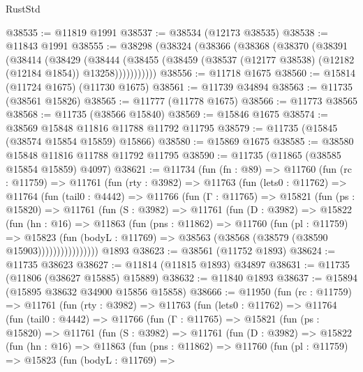 \begin{lexlean}{RustStd}
\begin{coremodule}
@38535 := @11819 @1991
@38537 := @38534 (@12173 @38535)
@38538 := @11843 @1991
@38555 := @38298
    (@38324
      (@38366
        (@38368
          (@38370
            (@38391
              (@38414
                (@38429
                  (@38444
                    (@38455
                      (@38459 (@38537 (@12177 @38538) (@12182 (@12184 @1854)) @13258)))))))))))
@38556 := @11718 @1675
@38560 := @15814 (@11724 @1675) (@11730 @1675)
@38561 := @11739 @34894
@38563 := @11735 (@38561 @15826)
@38565 := @11777 (@11778 @1675)
@38566 := @11773 @38565
@38568 := @11735 (@38566 @15840)
@38569 := @15846 @1675
@38574 := @38569 @15848 @11816 @11788 @11792 @11795
@38579 := @11735 (@15845 (@38574 @15854 @15859) @15866)
@38580 := @15869 @1675
@38585 := @38580 @15848 @11816 @11788 @11792 @11795
@38590 := @11735 (@11865 (@38585 @15854 @15859) @4097)
@38621 := @11734
    (fun (fn : @89) =>
    @11760
      (fun (rc : @11759) =>
      @11761
        (fun (rty : @3982) =>
        @11763
          (fun (lets0 : @11762) =>
          @11764
            (fun (tail0 : @4442) =>
            @11766
              (fun (Γ : @11765) =>
              @15821
                (fun (ps : @15820) =>
                @11761
                  (fun (S : @3982) =>
                  @11761
                    (fun (D : @3982) =>
                    @15822
                      (fun (hn : @16) =>
                      @11863
                        (fun (pns : @11862) =>
                        @11760
                          (fun (pl : @11759) =>
                          @15823
                            (fun (bodyL : @11769) =>
                            @38563 (@38568 (@38579 (@38590 @15903))))))))))))))))
    @1893
@38623 := @38561 (@11752 @1893)
@38624 := @11735 @38623
@38627 := @11814 (@11815 @1893) @34897
@38631 := @11735 (@11806 (@38627 @15885) @15889)
@38632 := @11840 @1893
@38637 := @15894 (@15895 @38632 @34900 @15856 @15858)
@38666 := @11950
    (fun (rc : @11759) =>
    @11761
      (fun (rty : @3982) =>
      @11763
        (fun (lets0 : @11762) =>
        @11764
          (fun (tail0 : @4442) =>
          @11766
            (fun (Γ : @11765) =>
            @15821
              (fun (ps : @15820) =>
              @11761
                (fun (S : @3982) =>
                @11761
                  (fun (D : @3982) =>
                  @15822
                    (fun (hn : @16) =>
                    @11863
                      (fun (pns : @11862) =>
                      @11760
                        (fun (pl : @11759) =>
                        @15823
                          (fun (bodyL : @11769) =>

\end{coremodule}
\end{lexlean}

